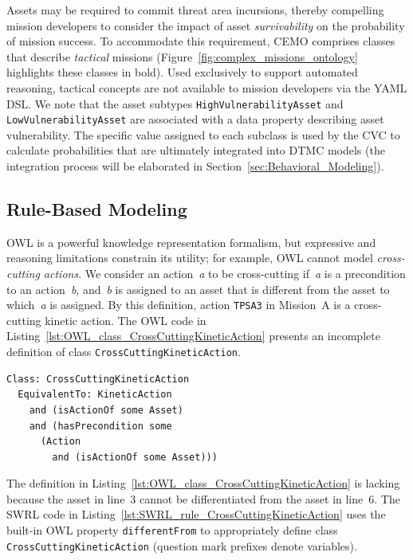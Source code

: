 Assets may be required to commit threat area incursions, thereby compelling mission developers to consider the impact of asset \emph{survivability} on the probability of mission success. To accommodate this requirement, CEMO comprises classes that describe \emph{tactical} missions (Figure~\ref{fig:complex_missions_ontology} highlights these classes in bold). Used exclusively to support automated reasoning, tactical concepts are not available to mission developers via the YAML DSL\@. We note that the asset subtypes \texttt{HighVulnerabilityAsset} and \texttt{LowVulnerabilityAsset} are associated with a data property describing asset vulnerability. The specific value assigned to each subclass is used by the CVC to calculate probabilities that are ultimately integrated into DTMC models (the integration process will be elaborated in Section~\ref{sec:Behavioral_Modeling}).

\subsection{Rule-Based Modeling}
\label{sec:Rule_Based_Modeling}

\noindent OWL is a powerful knowledge representation formalism, but expressive and reasoning limitations constrain its utility; for example, OWL cannot model \emph{cross-cutting actions}. We consider an action~\emph{a} to be cross-cutting if~\emph{a} is a precondition to an action~\emph{b}, and~\emph{b} is assigned to an asset that is different from the asset to which~\emph{a} is assigned. By this definition, action \texttt{TPSA3} in Mission~A is a cross-cutting kinetic action. The OWL code in Listing~\ref{lst:OWL_class_CrossCuttingKineticAction} presents an incomplete definition of class \texttt{CrossCuttingKineticAction}.

\begin{lstlisting}[caption={OWL code for class CrossCuttingKineticAction},label=lst:OWL_class_CrossCuttingKineticAction]
Class: CrossCuttingKineticAction
  EquivalentTo: KineticAction
    and (isActionOf some Asset)
    and (hasPrecondition some
      (Action
        and (isActionOf some Asset)))
\end{lstlisting}

The definition in Listing~\ref{lst:OWL_class_CrossCuttingKineticAction} is lacking because the asset in line~3 cannot be differentiated from the asset in line~6. The SWRL code in Listing~\ref{lst:SWRL_rule_CrossCuttingKineticAction} uses the built-in OWL property \texttt{differentFrom} to appropriately define class \texttt{CrossCuttingKineticAction} (question mark prefixes denote variables).


